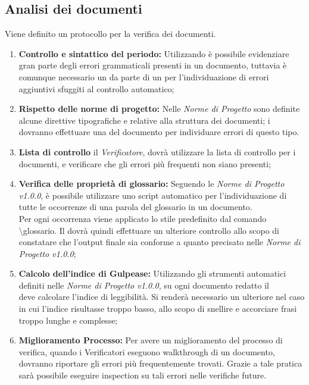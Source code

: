 \subsection{Analisi dei documenti}
Viene definito un protocollo per la verifica dei documenti.
\begin{enumerate}
	\item \textbf{Controllo e sintattico del periodo:} Utilizzando  è possibile evidenziare gran parte degli errori grammaticali presenti in un documento, tuttavia è comunque necessario un  da parte di un  per l'individuazione di errori aggiuntivi sfuggiti al controllo automatico;
	\item \textbf{Rispetto delle norme di progetto:} Nelle \textit{Norme di Progetto} sono definite alcune direttive tipografiche e relative alla struttura dei documenti;
	i  dovranno effettuare una  del documento per individuare errori di questo tipo.
	\item \textbf{Lista di controllo} il \textit{Verificatore}, dovrà utilizzare la lista di controllo per i documenti, e verificare che gli errori più frequenti non siano presenti;
	\item \textbf{Verifica delle proprietà di glossario:} Seguendo le \textit{Norme di Progetto v1.0.0}, è possibile utilizzare uno script automatico per l'individuazione di tutte le occorrenze di una parola del glossario in un documento.\\
	Per ogni occorrenza viene applicato lo stile  predefinito dal comando \textbackslash glossario.
	Il  dovrà quindi effettuare un ulteriore controllo allo scopo di constatare che l’output finale sia conforme a quanto precisato nelle \textit{Norme di Progetto v1.0.0};
	\item \textbf{Calcolo dell'indice di Gulpease:} Utilizzando gli strumenti automatici definiti nelle \textit{Norme di Progetto v1.0.0}, su ogni documento redatto il \\  deve calcolare l’indice di leggibilità.
	Si renderà necessario un ulteriore  nel caso in cui l’indice risultasse troppo basso, allo scopo di snellire e accorciare frasi troppo lunghe e complesse;
	\item \textbf{Miglioramento Processo:} Per avere un miglioramento del processo di verifica, quando i Verificatori eseguono
	walkthrough di un documento, dovranno riportare gli errori più frequentemente
	trovati. Grazie a tale pratica sarà possibile eseguire inspection su tali errori nelle
	verifiche future.
	
\end{enumerate}


